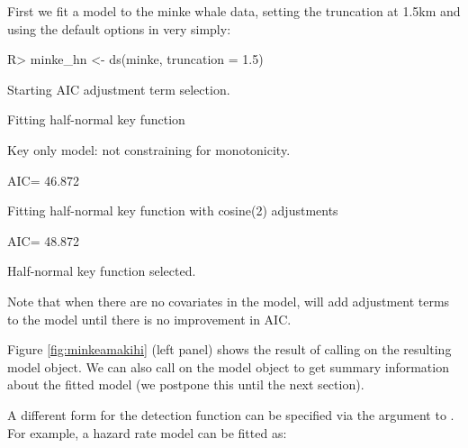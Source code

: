 \documentclass[article,shortnames]{jss}
\begin{document}
First we fit a model to the minke whale data, setting the truncation at
1.5km and using the default options in  very simply:

\begin{CodeChunk}
\begin{CodeInput}
R> minke_hn <- ds(minke, truncation = 1.5)
\end{CodeInput}
\begin{CodeOutput}
Starting AIC adjustment term selection.
\end{CodeOutput}
\begin{CodeOutput}
Fitting half-normal key function
\end{CodeOutput}
\begin{CodeOutput}
Key only model: not constraining for monotonicity.
\end{CodeOutput}
\begin{CodeOutput}
AIC= 46.872
\end{CodeOutput}
\begin{CodeOutput}
Fitting half-normal key function with cosine(2) adjustments
\end{CodeOutput}
\begin{CodeOutput}
AIC= 48.872
\end{CodeOutput}
\begin{CodeOutput}

Half-normal key function selected.
\end{CodeOutput}
\end{CodeChunk}

Note that when there are no covariates in the model,  will add
adjustment terms to the model until there is no improvement in AIC.

Figure \ref{fig:minkeamakihi} (left panel) shows the result of calling
 on the resulting model object. We can also call
 on the model object to get summary information about the
fitted model (we postpone this until the next section).

A different form for the detection function can be specified via the
 argument to . For example, a hazard rate model can
be fitted as:
\end{document}
